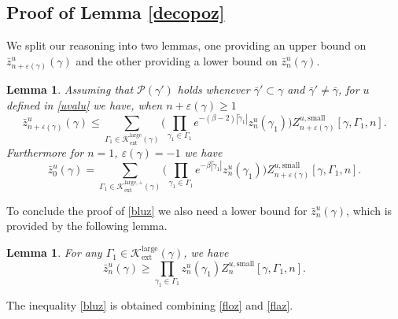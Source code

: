 \documentclass[10pt]{amsart}
\let\mathcal\mathscr
\numberwithin{equation}{section}
\theoremstyle{plain}
\newtheorem{lemma}[theorem]{Lemma}
\theoremstyle{definition}
\newcommand{\ext}{\mathrm{ext}}
\newcommand{\sm}{\mathrm{small}}
\newcommand{\larg}{\mathrm{large}}
\newcommand{\cP}{{\ensuremath{\mathcal P}} }
\newcommand{\cK}{{\ensuremath{\mathcal K}} }
\newcommand{\gb}{\beta}
\newcommand{\gep}{\varepsilon}
\newcommand{\gG}{\Gamma}
\begin{document}
\subsection{Proof of Lemma \ref{decopoz}}

We split our reasoning into two lemmas, one providing an upper bound on $\bar z^{u}_{n+\gep(\gamma)}(\gamma)$ and the other providing a lower bound on
$\bar z^{u}_{n}(\gamma)$.

\begin{lemma}\label{plif}
Assuming that $\cP(\gamma')$ holds whenever $\bar \gamma'\subset \gamma$ and $\bar \gamma'\ne \bar \gamma$,
for $u$ defined in \eqref{uvalu} we have, when $n+\gep(\gamma)\ge 1$
\begin{equation}\label{floz}
\bar z^{u}_{n+\gep(\gamma)}(\gamma)\le \sum_{\gG_1\in \cK^{\larg}_{\ext}(\gamma)}
\biggl(\prod_{\gamma_1\in \gG_1} e^{- (\gb-2) |\tilde \gamma_1|} z^u_{n}(\gamma_1) \biggr)
Z^{u,\sm}_{n+\gep(\gamma)}[\gamma, \gG_1,n].
\end{equation}
Furthermore for $n=1$, $\gep(\gamma)=-1$ we have
\begin{equation*}
\bar z^{u}_{0}(\gamma)= \sum_{\gG_1\in \cK^{\larg,+}_{\ext}(\gamma)}
\biggl(\prod_{\gamma_1\in \gG_1} e^{- \gb |\tilde \gamma_1|} z^u_{n}(\gamma_1) \biggr)
Z^{u,\sm}_{n+\gep(\gamma)}[\gamma, \gG_1,n].
\end{equation*}
\end{lemma}
To conclude the proof of \eqref{bluz} we also need a lower bound for $\bar z^u_n(\gamma)$, which is provided by the following lemma.

\begin{lemma}\label{plof}
For any $\gG_1\in \cK^{\larg}_{\ext}(\gamma)$, we have
\begin{equation}\label{flaz}
\bar z^{u}_{n}(\gamma)\ge \prod_{\gamma_1\in \gG_1} z^u_{n}(\gamma_1)
Z^{u,\sm}_{n}[\gamma, \gG_1,n].
\end{equation}
\end{lemma}
The inequality \eqref{bluz} is obtained combining \eqref{floz} and \eqref{flaz}.
\end{document}
